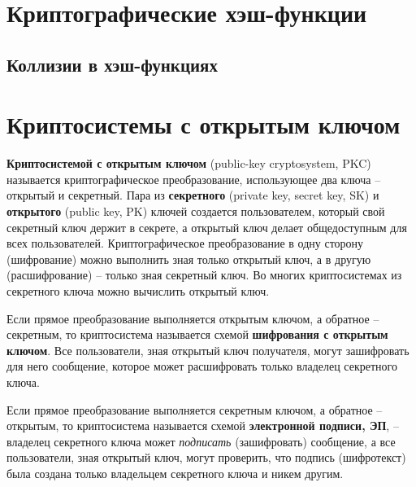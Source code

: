 \documentclass[10pt,a4paper]{book}
\begin{document}
\chapter{Криптографические хэш-функции}







\section{Коллизии в хэш-функциях}







\chapter{Криптосистемы с открытым ключом}

\textbf{Криптосистемой с открытым ключом} (public-key cryptosystem, PKC) называется криптографическое преобразование, использующее  два ключа -- открытый и секретный. Пара из \textbf{секретного} (private key, secret key, SK) и \textbf{открытого} (public key, PK) ключей создается пользователем, который свой секретный ключ держит в секрете, а открытый ключ делает общедоступным для всех пользователей. Криптографическое преобразование в одну сторону (шифрование) можно выполнить  зная только открытый ключ, а в другую (расшифрование) -- только зная секретный ключ. Во многих криптосистемах из секретного ключа можно вычислить открытый ключ.

Если прямое преобразование выполняется открытым ключом, а обратное -- секретным, то криптосистема называется схемой \textbf{шифрования с открытым ключом}. Все пользователи, зная открытый ключ получателя, могут зашифровать для него сообщение, которое может расшифровать только владелец секретного ключа.

Если прямое преобразование выполняется секретным ключом, а обратное -- открытым, то криптосистема называется схемой \textbf{электронной подписи, ЭП}, -- владелец секретного ключа может \emph{подписать} (зашифровать) сообщение, а все пользователи, зная открытый ключ, могут проверить, что подпись (шифротекст) была создана только владельцем секретного ключа и никем другим.
\end{document}
